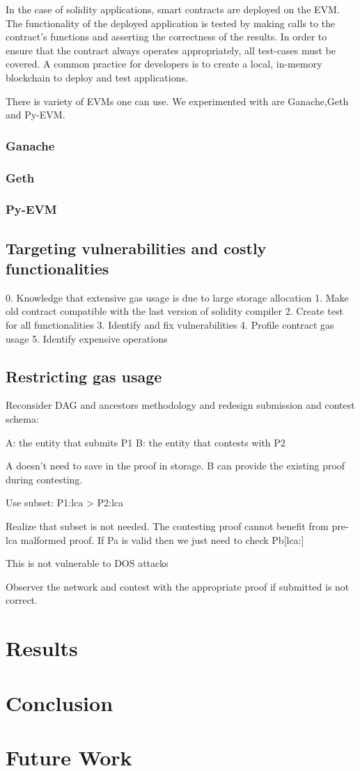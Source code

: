 \documentclass{article}
\begin{document}
In the case of solidity applications, smart contracts are deployed on the EVM. The functionality of the deployed application is tested by making calls to the contract's functions and asserting the correctness of the results. In order to ensure that the contract always operates appropriately, all test-cases must be covered. A common practice for developers is to create a local, in-memory blockchain to deploy and test applications.

There is variety of EVMs one can use. We experimented with are Ganache,Geth and Py-EVM.

\subsubsection{Ganache}
\subsubsection{Geth}
\subsubsection{Py-EVM}

\subsection{Targeting vulnerabilities and costly functionalities}

0. Knowledge that extensive gas usage is due to large storage allocation
1. Make old contract compatible with the last version of solidity compiler
2. Create test for all functionalities
3. Identify and fix vulnerabilities
4. Profile contract gas usage
5. Identify expensive operations

\subsection{Restricting gas usage}

Reconsider DAG and ancestors methodology and redesign submission and contest schema:

A: the entity that submits P1
B: the entity that contests with P2

A doesn't need to save in the proof in storage. B can provide the existing proof during contesting.

Use subset: P1{:lca} > P2{:lca}

Realize that subset is not needed. The contesting proof cannot benefit from pre-lca malformed proof. If Pa is valid then we just need to check Pb[lca:]

This is not vulnerable to DOS attacks

Observer the network and contest with the appropriate proof if submitted is not correct.

\section{Results}
\section{Conclusion}
\section{Future Work}
\end{document}

